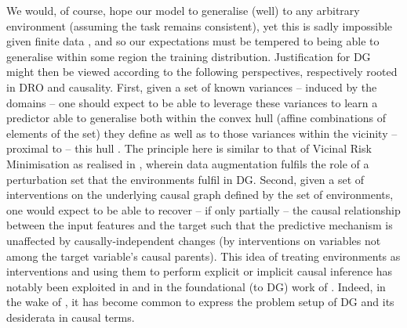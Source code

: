 %
We would, of course, hope our model to generalise (well) to any arbitrary environment (assuming the
task remains consistent), yet this is sadly impossible given finite data
\citep{david2010impossibility}, and so our expectations must be tempered to being able to
generalise within some region the training distribution.
%
%
Justification for \ac{DG} might then be viewed according to the following perspectives,
respectively rooted in \ac{DRO} and causality.
%
First, given a set of known variances -- induced by the domains -- one should expect to be able to
leverage these variances to learn a predictor able to generalise both within the convex hull
(affine combinations of elements of the set) they define as well as to those variances within the
vicinity -- proximal to -- this hull \citep{krueger2021out}.
The principle here is similar to that of Vicinal Risk Minimisation \citep{chapelle2000vicinal} as
realised in \citet{zhang2017mixup}, wherein data augmentation fulfils the role of a perturbation
set that the environments fulfil in \ac{DG}.
%
Second, given a set of interventions on the underlying causal graph defined by the set of
environments, one would expect to be able to recover -- if only partially -- the causal
relationship between the input features and the target such that the predictive mechanism is
unaffected by causally-independent changes (by interventions on variables not among the target
variable's causal parents).
%
This idea of treating environments as interventions and using them to perform explicit or
implicit causal inference has notably been exploited in \citet{peters2016causal} and in the
foundational (to \ac{DG}) work of \citet{arjovsky2019invariant}.
%
Indeed, in the wake of \citet{arjovsky2019invariant}, it has become common \citep{
gulrajani2020search, krueger2021out, mahajan2021domain, lin2022zin} to express the problem setup of
\ac{DG} and its desiderata in causal terms.
%


